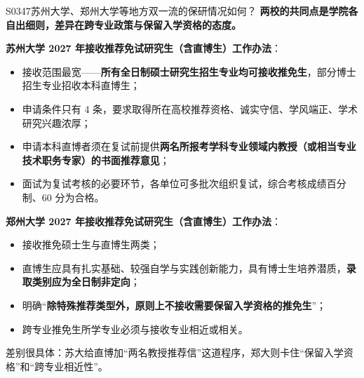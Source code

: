 \begin{qa}{S0347}{苏州大学、郑州大学等地方双一流的保研情况如何？}
\textbf{两校的共同点是学院各自出细则，差异在跨专业政策与保留入学资格的态度。}

\textbf{苏州大学 2027 年接收推荐免试研究生（含直博生）工作办法}：

\begin{itemize}
  \item 接收范围最宽——\textbf{所有全日制硕士研究生招生专业均可接收推免生}，部分博士招生专业招收本科直博生；
  \item 申请条件只有 4 条，要求取得所在高校推荐资格、诚实守信、学风端正、学术研究兴趣浓厚；
  \item 申请本科直博者须在复试前提供\textbf{两名所报考学科专业领域内教授（或相当专业技术职务专家）的书面推荐意见}；
  \item 面试为复试考核的必要环节，各单位可多批次组织复试，综合考核成绩百分制、60 分为合格。
\end{itemize}

\textbf{郑州大学 2027 年接收推荐免试研究生（含直博生）工作办法}：

\begin{itemize}
  \item 接收推免硕士生与直博生两类；
  \item 直博生应具有扎实基础、较强自学与实践创新能力，具有博士生培养潜质，\textbf{录取类别应为全日制非定向}；
  \item 明确“\textbf{除特殊推荐类型外，原则上不接收需要保留入学资格的推免生}”；
  \item 跨专业推免生所学专业必须与接收专业相近或相关。
\end{itemize}

差别很具体：苏大给直博加“两名教授推荐信”这道程序，郑大则卡住“保留入学资格”和“跨专业相近性”。
\end{qa}

